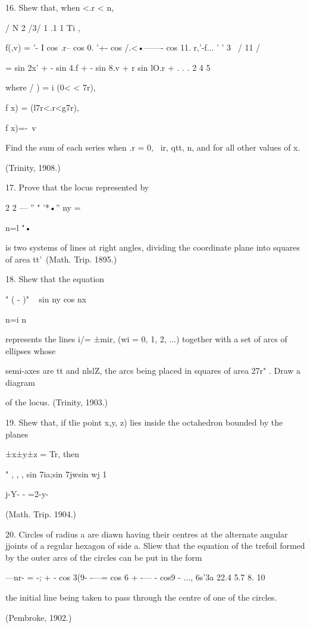 {16. Shew that, when <.r < n, 

 / N 2 /3/ 1 .1   1 Ti , \ 

f(,v) = '- I cos .r-- cos 0. '+- cos /.<•——- cos 11. r,'-f... 
 '   '  3 \ / 11 / 

= sin 2x' + - sin 4.f + - sin 8.v + r sin lO.r + . . . 
2 4 5 

where /  ) = i  (0< < 7r), 

f x) = (l7r<.r<g7r), 

f x)=-\ v  %

Find the sum of each series when .r = 0, \ ir, qtt, n, and for all other values of x. 

(Trinity, 1908.) 

17. Prove that the locus represented by 

2   2 — '' " '*•''    ny = 

n=l "• 

is two systems of lines at right angles, dividing the coordinate plane into squares of 
area tt'\ (Math. Trip. 1895.) 

18. Shew that the equation 

" ( - )" ~   sin ny cos nx \  

n=i n  ~ 

represents the lines i/= ±mir, (wi = 0, 1, 2, ...) together with a set of arcs of ellipses whose 

semi-axes are tt and nlslZ, the arcs being placed in squares of area 27r" . Draw a diagram 

of the locus. (Trinity, 1903.) 

19. Shew that, if tlie point  x,y, z) lies inside the octahedron bounded by the planes 

±x±y±z = Tr, then 

"  , , , sin 7ia;sin 7jwsin wj 1 

 j-Y-  -  =2-y- 

(Math. Trip. 1904.) 

20. Circles of radius a are diawn having their centres at the alternate angular jjoints 
of a regular hexagon of side a. Sliew that the equation of the trefoil formed by the outer 
arcs of the circles can be put in the form 

—nr- = -; +   -  cos 3(9- -—= cos 6 + -— - cos9 - ..., 
6s'3a 22.4 5.7 8. 10 

the initial line being taken to pass through the centre of one of the circles. 

(Pembroke, 1902.) 



}
